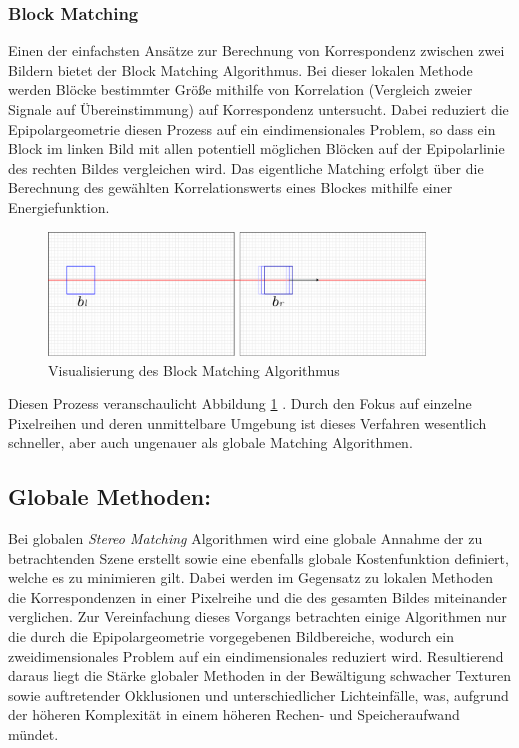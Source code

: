 \subsubsection{Block Matching}
\label{subsec:stereo_matching_bm}
Einen der einfachsten Ansätze zur Berechnung von Korrespondenz zwischen zwei Bildern bietet der Block Matching Algorithmus. Bei dieser lokalen Methode werden Blöcke bestimmter Größe mithilfe von Korrelation (Vergleich zweier Signale auf Übereinstimmung) auf Korrespondenz untersucht. Dabei reduziert die Epipolargeometrie diesen Prozess auf ein eindimensionales Problem, so dass ein Block im linken Bild mit allen potentiell möglichen Blöcken auf der Epipolarlinie des rechten Bildes vergleichen wird. Das eigentliche Matching erfolgt über die Berechnung des gewählten Korrelationswerts eines Blockes mithilfe einer Energiefunktion.

\begin{figure}[h]
	\begin{center}
		\includegraphics[width=10cm]{img/block_matching.pdf}
	\end{center}
	\caption{Visualisierung des Block Matching Algorithmus}
	\label{fig:block_matching}
\end{figure}

\noindent
Diesen Prozess veranschaulicht Abbildung \ref{fig:block_matching} . Durch den Fokus auf einzelne Pixelreihen und deren unmittelbare Umgebung ist dieses Verfahren wesentlich schneller, aber auch ungenauer als globale Matching Algorithmen. 


\subsection{Globale Methoden:}
\label{subsec:global_methods}
Bei globalen \emph{Stereo Matching} Algorithmen wird eine globale Annahme der zu betrachtenden Szene erstellt sowie eine ebenfalls globale Kostenfunktion definiert, welche es zu minimieren gilt. Dabei werden im Gegensatz zu lokalen Methoden die Korrespondenzen in einer Pixelreihe und die des gesamten Bildes miteinander verglichen. Zur Vereinfachung dieses Vorgangs betrachten einige Algorithmen nur die durch die Epipolargeometrie vorgegebenen Bildbereiche, wodurch ein zweidimensionales Problem auf ein eindimensionales reduziert wird. Resultierend daraus liegt die Stärke globaler Methoden in der Bewältigung schwacher Texturen sowie auftretender Okklusionen und unterschiedlicher Lichteinfälle, was, aufgrund der höheren Komplexität in einem höheren Rechen- und Speicheraufwand mündet.

